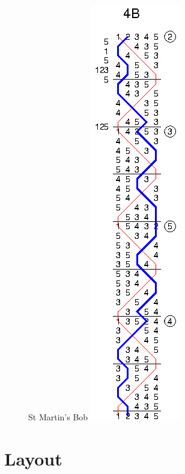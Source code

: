 \begin{figure}[t]
\begin{minipage}[t]{0.24\textwidth}
  \end{minipage}
  \begin{minipage}[t]{0.24\textwidth}
    \centering
    St Martin's Bob
    \includegraphics{figs/methods/single-hunt/4B}
  \end{minipage}
\end{figure}

\chapter{Layout}

\layout{}

